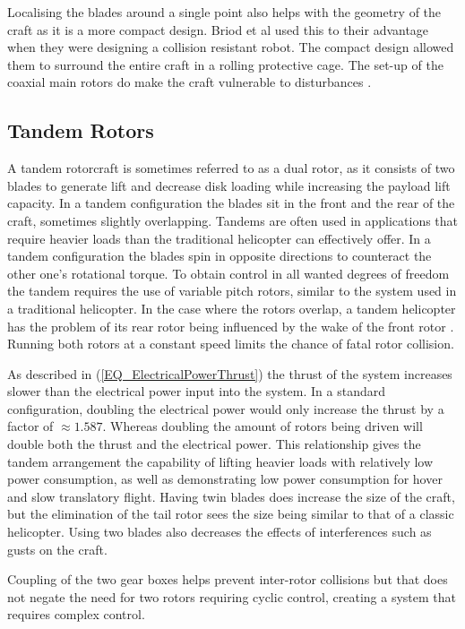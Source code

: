 \documentclass[a4paper, 10pt, conference]{ieeeconf}
\begin{document}
Localising the blades around a single point also helps with the geometry of the craft as it is a more compact design. Briod et al \cite{Briod2012, Klaptocz2010, Collision} used this to their advantage when they were designing a collision resistant robot. The compact design allowed them to surround the entire craft in a rolling protective cage. The set-up of the coaxial main rotors do make the craft vulnerable to disturbances \cite{NasaCoaxial}.

\subsection{Tandem Rotors}
A tandem rotorcraft is sometimes referred to as a dual rotor, as it consists of two blades to generate lift and decrease disk loading while increasing the payload lift capacity. In a tandem configuration the blades sit in the front and the rear of the craft, sometimes slightly overlapping. Tandems are often used in applications that require heavier loads than the traditional helicopter can effectively offer. In a tandem configuration the blades spin in opposite directions to counteract the other one's rotational torque. To obtain control in all wanted degrees of freedom the tandem requires the use of variable pitch rotors, similar to the system used in a traditional helicopter. In the case where the rotors overlap, a tandem helicopter has the problem of its rear rotor being influenced by the wake of the front rotor \cite{Camrad}. Running both rotors at a constant speed limits the chance of fatal rotor collision.

As described in (\ref{EQ_ElectricalPowerThrust}) the thrust of the system increases slower than the electrical power input into the system. In a standard configuration, doubling the electrical power would only increase the thrust by a factor of $\approx 1.587$. Whereas doubling the amount of rotors being driven will double both the thrust and the electrical power. This relationship gives the tandem arrangement the capability of lifting heavier loads with relatively low power consumption, as well as demonstrating low power consumption for hover and slow translatory flight. Having twin blades does increase the size of the craft, but the elimination of the tail rotor sees the size being similar to that of a classic helicopter. Using two blades also decreases the effects of interferences such as gusts on the craft. 

Coupling of the two gear boxes helps prevent inter-rotor collisions but that does not negate the need for two rotors requiring cyclic control, creating a system that requires complex control.
\end{document}
